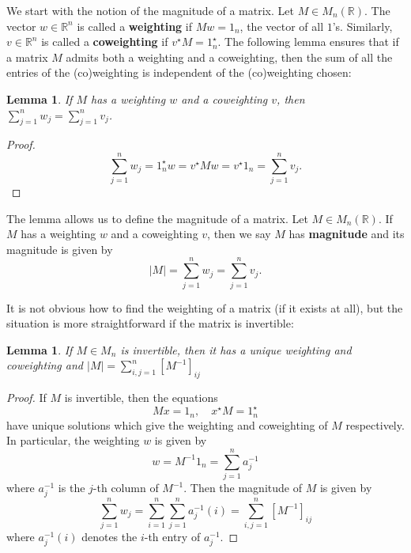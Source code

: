 \documentclass[11pt]{article}
\theoremstyle{mythm}
\newtheorem{lem}[defn]{Lemma}
\begin{document}
We start with the notion of the magnitude of a matrix. Let $M \in M_n(\mathbb{R})$. The vector $w \in \mathbb{R}^n$ is called a \textbf{weighting} if $Mw = 1_n$, the vector of all $1$'s. Similarly, $v \in \mathbb{R}^n$ is called a \textbf{coweighting} if $v^\star M = 1_n^\star$. The following lemma ensures that if a matrix $M$ admits both a weighting and a coweighting, then the sum of all the entries of the (co)weighting is independent of the (co)weighting chosen:

\begin{lem}\label{lem:indepweighting}
If $M$ has a weighting $w$ and a coweighting $v$, then $\sum\limits_{j=1}^{n}w_j = \sum\limits_{j=1}^{n}v_j$.
\end{lem}

\begin{proof}
\begin{equation*}
\sum\limits_{j=1}^{n}w_j = 1_n^\star w = v^\star Mw = v^\star 1_n = \sum\limits_{j=1}^{n}v_j.
\end{equation*}
\end{proof}

The lemma allows us to define the magnitude of a matrix. Let $M \in M_n(\mathbb{R})$. If $M$ has a weighting $w$ and a coweighting $v$, then we say $M$ has \textbf{magnitude} and its magnitude is given by
\begin{equation*}
\vert M \vert = \sum\limits_{j=1}^{n} w_j = \sum\limits_{j=1}^{n}v_j.
\end{equation*}

It is not obvious how to find the weighting of a matrix (if it exists at all), but the situation is more straightforward if the matrix is invertible:

\begin{lem}\label{lem:inv}
If $M \in M_n$ is invertible, then it has a unique weighting and coweighting and $\vert M \vert = \sum\limits_{i,j=1}^{n}[M^{-1}]_{ij}$
\end{lem}

\begin{proof}
If $M$ is invertible, then the equations
\begin{equation*}
Mx = 1_n, \quad x^\star M = 1_n^\star
\end{equation*}
have unique solutions which give the weighting and coweighting of $M$ respectively. In particular, the weighting $w$ is given by
\begin{equation*}
w = M^{-1}1_n = \sum\limits_{j=1}^{n} a_j^{-1}
\end{equation*}
where $a_j^{-1}$ is the $j$-th column of $M^{-1}$. Then the magnitude of $M$ is given by
\begin{equation*}
\sum\limits_{j=1}^{n}w_j = \sum\limits_{i=1}^{n}\sum\limits_{j=1}^{n}a_{j}^{-1}(i) = \sum\limits_{i,j=1}^{n}[M^{-1}]_{ij}
\end{equation*}
where $a_{j}^{-1}(i)$ denotes the $i$-th entry of $a_j^{-1}$.
\end{proof}
\end{document}
